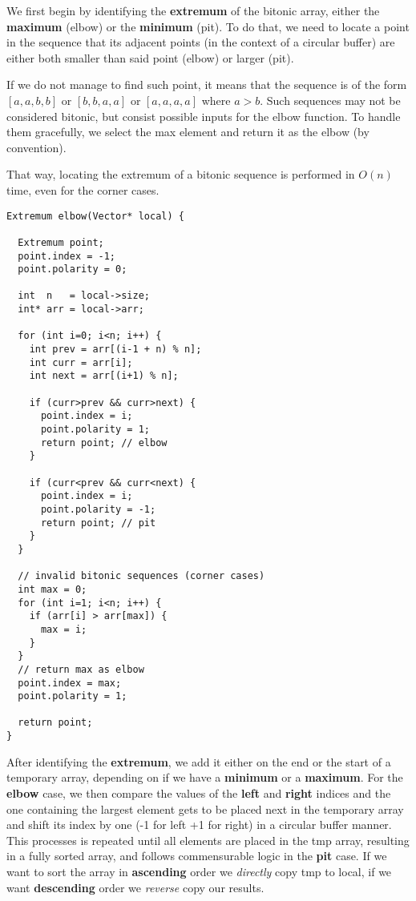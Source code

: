 \documentclass[12pt]{report}
\begin{document}
We first begin by identifying the \textbf{extremum} of the bitonic array, either the \textbf{maximum} (elbow) or the \textbf{minimum} (pit). To do that, we need to locate a point in the sequence that its adjacent points (in the context of a circular buffer) are either both smaller than said point (elbow) or larger (pit). 

If we do not manage to find such point, it means that the sequence is of the form $[a, a, b, b]$ or $[b, b, a, a]$ or $[a, a, a, a]$ where $a>b$. Such sequences may not be considered bitonic, but consist possible inputs for the elbow function. To handle them gracefully, we select the max element and return it as the elbow (by convention). 

That way, locating the extremum of a bitonic sequence is performed in $O(n)$ time, even for the corner cases. \newpage

\begin{lstlisting}[style=cstyle] 
Extremum elbow(Vector* local) {

  Extremum point;
  point.index = -1;
  point.polarity = 0;

  int  n   = local->size;
  int* arr = local->arr;

  for (int i=0; i<n; i++) {
    int prev = arr[(i-1 + n) % n];
    int curr = arr[i];
    int next = arr[(i+1) % n];

    if (curr>prev && curr>next) {
      point.index = i;
      point.polarity = 1;
      return point; // elbow
    }

    if (curr<prev && curr<next) {
      point.index = i;
      point.polarity = -1;
      return point; // pit
    }
  }

  // invalid bitonic sequences (corner cases)
  int max = 0;
  for (int i=1; i<n; i++) {
    if (arr[i] > arr[max]) {
      max = i;
    }
  }
  // return max as elbow
  point.index = max;
  point.polarity = 1;

  return point;
}
\end{lstlisting}

After identifying the \textbf{extremum}, we add it either on the end or the start of a temporary array, depending on if we have a \textbf{minimum} or a \textbf{maximum}. For the \textbf{elbow} case, we then compare the values of the \textbf{left} and \textbf{right} indices and the one containing the largest element gets to be placed next in the temporary array and shift its index by one (-1 for left +1 for right) in a circular buffer manner. This processes is repeated until all elements are placed in the tmp array, resulting in a fully sorted array, and follows commensurable logic in the \textbf{pit} case. If we want to sort the array in \textbf{ascending} order we \textit{directly} copy tmp to local, if we want \textbf{descending} order we \textit{reverse} copy our results. \newpage
\end{document}
